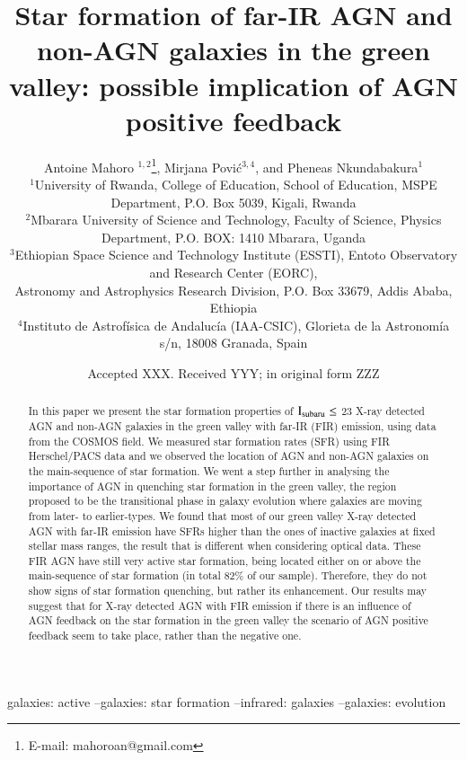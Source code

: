 \documentclass[fleqn,usenatbib]{mnras}
\title[Green valley active and inactive galaxies]{Star formation of far-IR AGN and non-AGN galaxies in the green valley: possible implication of AGN positive feedback}
\author[Antoine Mahoro]{Antoine Mahoro $^{1, 2}$\thanks{E-mail:
mahoroan@gmail.com}, Mirjana Povi\'c$^{3, 4}$, and Pheneas Nkundabakura$^{1}$\\
$^{1}$University of Rwanda, College of Education, School of Education, MSPE Department, P.O. Box 5039, Kigali, Rwanda\\
$^{2}$Mbarara University of Science and Technology, Faculty of Science, Physics Department, P.O. BOX: 1410 Mbarara, Uganda\\
$^{3}$Ethiopian Space Science and Technology Institute (ESSTI), Entoto Observatory and Research Center (EORC), \\
Astronomy and Astrophysics Research Division, P.O. Box 33679, Addis Ababa, Ethiopia\\
$^{4}$Instituto de Astrof\'isica de Andaluc\'ia (IAA-CSIC), Glorieta de la Astronom\'ia s/n, 18008 Granada, Spain}
\date{Accepted XXX. Received YYY; in original form ZZZ}
\begin{document}
\label{firstpage}
\pagerange{\pageref{firstpage}--\pageref{lastpage}}
\maketitle

\begin{abstract}
In this paper we present the star formation properties of $\rm{I_{subaru}\leq}$ 23 X-ray detected AGN and non-AGN galaxies in the green valley with far-IR (FIR) emission, using data from the COSMOS field. We measured star formation rates (SFR) using FIR Herschel/PACS data and we observed the location of AGN and non-AGN galaxies on the main-sequence of star formation. We went a step further in analysing the importance of AGN in quenching star formation in the green valley, the region proposed to be the transitional phase in galaxy evolution where galaxies are moving from later- to earlier-types. We found that most of our green valley X-ray detected AGN with far-IR emission have SFRs higher than the ones of inactive galaxies at fixed stellar mass ranges, the result that is different when considering optical data. These FIR AGN have still very active star formation, being located either on or above the main-sequence of star formation (in total 82\% of our sample). Therefore, they do not show signs of star formation quenching, but rather its enhancement. Our results may suggest that for X-ray detected AGN with FIR emission if there is an influence of AGN feedback on the star formation in the green valley the scenario of AGN positive feedback seem to take place, rather than the negative one.
\end{abstract}

\begin{keywords}
galaxies: active --galaxies: star formation --infrared: galaxies --galaxies: evolution
\end{keywords}


\end{document}
